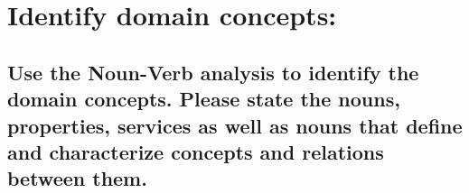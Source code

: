 	\section{Identify domain concepts:}
		\subsection{Use the Noun-Verb analysis to identify the domain concepts. Please state the
			nouns, properties, services as well as nouns that define and characterize
			concepts and relations between them.}